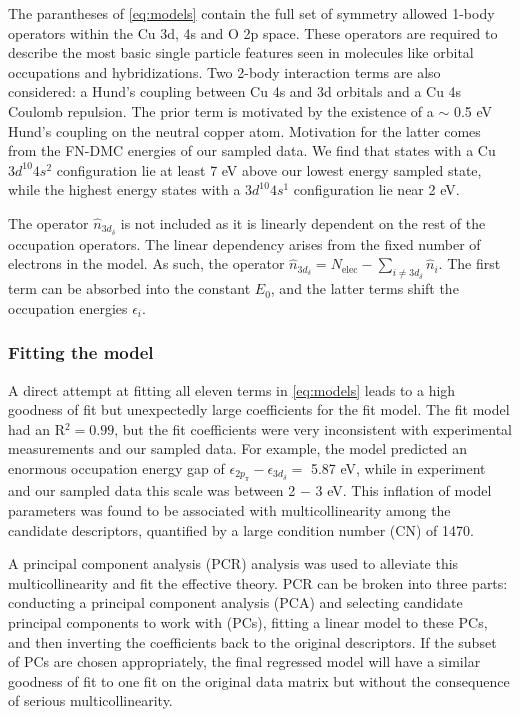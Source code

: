 \documentclass[12pt]{article}
\begin{document}
The parantheses of \eqref{eq:models} contain the full set of symmetry allowed 1-body operators within the Cu 3d, 4s and O 2p space.
These operators are required to describe the most basic single particle features seen in molecules like orbital occupations and hybridizations.
Two 2-body interaction terms are also considered: a Hund's coupling between Cu 4s and 3d orbitals and a Cu 4s Coulomb repulsion.
The prior term is motivated by the existence of a $\sim $ 0.5 eV Hund's coupling on the neutral copper atom.
Motivation for the latter comes from the FN-DMC energies of our sampled data.
We find that states with a Cu $3d^{10} 4s^{2}$ configuration lie at least 7 eV above our lowest energy sampled state, while the highest energy states with a $3d^{10} 4s^{1}$ configuration lie near 2 eV.

The operator $\hat{n}_{3d_\delta}$ is not included as it is linearly dependent on the rest of the occupation operators.
The linear dependency arises from the fixed number of electrons in the model.
As such, the operator $\hat{n}_{3d_\delta} = N_\text{elec} - \sum_{i \neq 3d_\delta} \hat{n}_i$.
The first term can be absorbed into the constant $E_0$, and the latter terms shift the occupation energies $\epsilon_i$.

\subsubsection{Fitting the model}
A direct attempt at fitting all eleven terms in \eqref{eq:models} leads to a high goodness of fit but unexpectedly large coefficients for the fit model.
The fit model had an R$^2= 0.99$, but the fit coefficients were very inconsistent with experimental measurements and our sampled data.
For example, the model predicted an enormous occupation energy gap of $\epsilon_{2p_\pi} - \epsilon_{3d_\delta} = $ 5.87 eV, while in experiment and our sampled data this scale was between 2 $-$ 3 eV.
This inflation of model parameters was found to be associated with multicollinearity among the candidate descriptors, quantified by a large condition number (CN) of 1470.

A principal component analysis (PCR) analysis was used to alleviate this multicollinearity and fit the effective theory.
PCR can be broken into three parts: conducting a principal component analysis (PCA) and selecting candidate principal components to work with (PCs), fitting a linear model to these PCs, and then inverting the coefficients back to the original descriptors.
If the subset of PCs are chosen appropriately, the final regressed model will have a similar goodness of fit to one fit on the original data matrix but without the consequence of serious multicollinearity.
\end{document}
